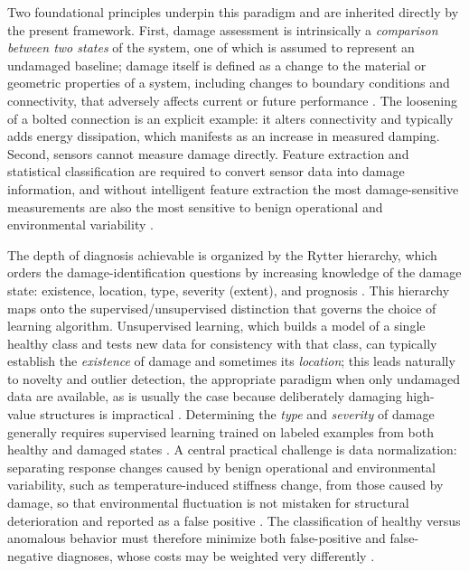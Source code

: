 Two foundational principles underpin this paradigm and are inherited directly by the present framework. First, damage assessment is intrinsically a \textit{comparison between two states} of the system, one of which is assumed to represent an undamaged baseline; damage itself is defined as a change to the material or geometric properties of a system, including changes to boundary conditions and connectivity, that adversely affects current or future performance \citep{farrar2013shm}. The loosening of a bolted connection is an explicit example: it alters connectivity and typically adds energy dissipation, which manifests as an increase in measured damping. Second, sensors cannot measure damage directly. Feature extraction and statistical classification are required to convert sensor data into damage information, and without intelligent feature extraction the most damage-sensitive measurements are also the most sensitive to benign operational and environmental variability \citep{farrar2013shm}.

The depth of diagnosis achievable is organized by the Rytter hierarchy, which orders the damage-identification questions by increasing knowledge of the damage state: existence, location, type, severity (extent), and prognosis \citep{farrar2013shm}. This hierarchy maps onto the supervised/unsupervised distinction that governs the choice of learning algorithm. Unsupervised learning, which builds a model of a single healthy class and tests new data for consistency with that class, can typically establish the \textit{existence} of damage and sometimes its \textit{location}; this leads naturally to novelty and outlier detection, the appropriate paradigm when only undamaged data are available, as is usually the case because deliberately damaging high-value structures is impractical \citep{sohn2003statistical,wangcha2022unsupervised}. Determining the \textit{type} and \textit{severity} of damage generally requires supervised learning trained on labeled examples from both healthy and damaged states \citep{farrar2013shm,figueiredo2010machine}. A central practical challenge is data normalization: separating response changes caused by benign operational and environmental variability, such as temperature-induced stiffness change, from those caused by damage, so that environmental fluctuation is not mistaken for structural deterioration and reported as a false positive \citep{figueiredo2010machine}. The classification of healthy versus anomalous behavior must therefore minimize both false-positive and false-negative diagnoses, whose costs may be weighted very differently \citep{farrar2013shm}.

